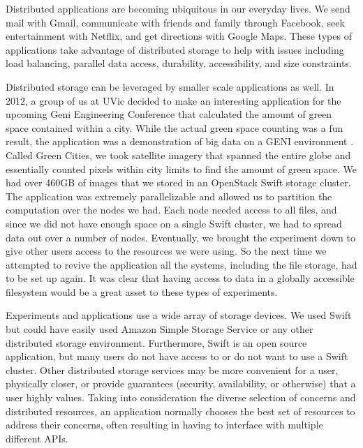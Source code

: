 \label{chapter:intro}

Distributed applications are becoming ubiquitous in our everyday lives. We
send mail with Gmail, communicate with friends and family through Facebook,
seek entertainment with Netflix, and get directions with Google Maps. These
types of applications take advantage of distributed storage to help with
issues including load balancing, parallel data access, durability,
accessibility, and size constraints.

Distributed storage can be leveraged by smaller scale applications as well. In
2012, a group of us at UVic decided to make an interesting application for the
upcoming Geni Engineering Conference that calculated the amount of green space
contained within a city. While the actual green space counting was a fun
result, the application was a demonstration of big data on a GENI environment
\cite{Geni}. Called Green Cities, we took satellite imagery that spanned the
entire globe and essentially counted pixels within city limits to find the
amount of green space. We had over 460GB of images that we stored in an
OpenStack Swift \cite{Swift} storage cluster. The application was extremely
parallelizable and allowed us to partition the computation over the nodes we
had. Each node needed access to all files, and since we did not have enough
space on a single Swift cluster, we had to spread data out over a number of
nodes. Eventually, we brought the experiment down to give other users access
to the resources we were using. So the next time we attempted to revive the
application all the systems, including the file storage, had to be set up
again. It was clear that having access to data in a globally accessible
filesystem would be a great asset to these types of experiments.

Experiments and applications use a wide array of storage devices. We used
Swift but could have easily used Amazon Simple Storage Service \cite{amazons3}
or any other distributed storage environment. Furthermore, Swift is an open
source application, but many users do not have access to or do not want to use a
Swift cluster. Other distributed storage services may be more convenient for a
user, physically closer, or provide guarantees (security, availability, or
otherwise) that a user highly values. Taking into consideration the diverse
selection of concerns and distributed resources, an application normally
chooses the best set of resources to address their concerns, often resulting
in having to interface with multiple different APIs.


